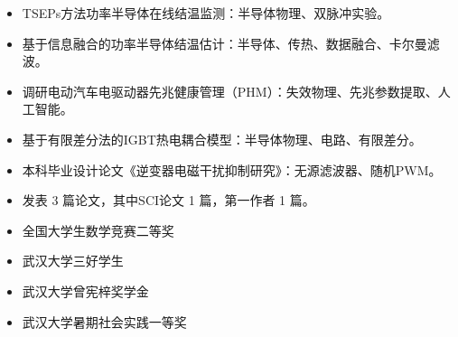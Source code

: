 \documentclass[zh]{resume}
\begin{document}
\begin{itemize}
  \item TSEPs方法功率半导体在线结温监测：半导体物理、双脉冲实验。
  \item 基于信息融合的功率半导体结温估计：半导体、传热、数据融合、卡尔曼滤波。
  \item 调研电动汽车电驱动器先兆健康管理（PHM）：失效物理、先兆参数提取、人工智能。
  \item 基于有限差分法的IGBT热电耦合模型：半导体物理、电路、有限差分。
  \item 本科毕业设计论文《逆变器电磁干扰抑制研究》：无源滤波器、随机PWM。
  \item 发表 3 篇论文，其中SCI论文 1 篇，第一作者 1 篇。
\end{itemize}

\begin{itemize}
  \item 全国大学生数学竞赛二等奖
  \item 武汉大学三好学生
  \item 武汉大学曾宪梓奖学金
  \item 武汉大学暑期社会实践一等奖
\end{itemize}


\end{document}
